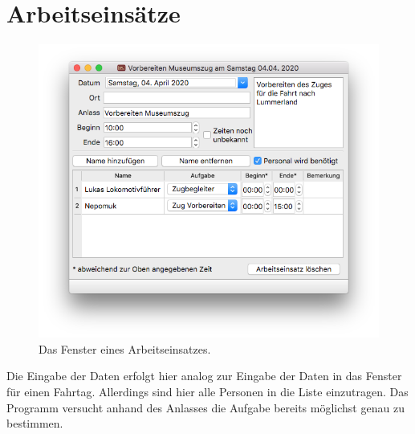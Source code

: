 \chapter{Arbeitseinsätze}\label{arbeitseinsatz}
\begin{figure}[h!]
	\includegraphics[width=\textwidth]{img/arbeitseinsatz}
	\caption{Das Fenster eines Arbeitseinsatzes.}
	\label{fig:arbeitseinsatz}
\end{figure}
Die Eingabe der Daten erfolgt hier analog zur Eingabe der Daten in das Fenster für einen Fahrtag.
Allerdings sind hier alle Personen in die Liste einzutragen.
Das Programm versucht anhand des Anlasses die Aufgabe bereits möglichst genau zu bestimmen.
